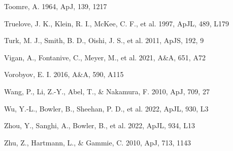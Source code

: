 \documentclass[12pt,preprint]{aastex}
\begin{document}
\begin{references}
Toomre, A. 1964, ApJ, 139, 1217

Truelove, J. K., Klein, R. I., McKee, C. F., et al. 1997, ApJL, 489, L179

Turk, M. J., Smith, B. D., Oishi, J. S., et al. 2011, ApJS, 192, 9

Vigan, A., Fontanive, C., Meyer, M., et al. 2021, A\&A, 651, A72

Vorobyov, E. I. 2016, A\&A, 590, A115

Wang, P., Li, Z.-Y., Abel, T., \& Nakamura, F. 2010, ApJ, 709, 27

Wu, Y.-L., Bowler, B., Sheehan, P. D., et al. 2022, ApJL, 930, L3

Zhou, Y., Sanghi, A., Bowler, B., et al. 2022, ApJL, 934, L13

Zhu, Z., Hartmann, L., \& Gammie, C. 2010, ApJ, 713, 1143



\end{references}
\end{document}
